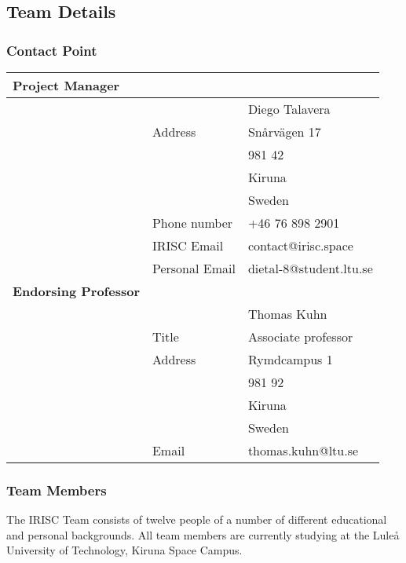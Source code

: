 \subsection{Team Details}
\subsubsection{Contact Point}


\begin{tabular}{m{} m{} m{}}
	\textbf{Project Manager} & & \\	\hline
	 & & Diego Talavera \\
	 & Address & Snårvägen 17 \\
	 & & 981 42 \\
	 & & Kiruna \\
	 & & Sweden \\
	 & Phone number & +46 76 898 2901\\
 	 & IRISC Email & contact@irisc.space \\
	 & Personal Email & dietal-8@student.ltu.se\\
	 \textbf{Endorsing Professor} & & \\ \hline
	 & & Thomas Kuhn \\
	 & Title & Associate professor \\
	 & Address & Rymdcampus 1 \\
	 & &  981 92 \\
	 & & Kiruna \\
	 & & Sweden \\
	 & Email & thomas.kuhn@ltu.se \\

\end{tabular}

\subsubsection{Team Members}
The IRISC Team consists of twelve people of a number of different educational and personal backgrounds. All team members are currently studying at the Lule{\aa} University of Technology, Kiruna Space Campus.

\bigskip

